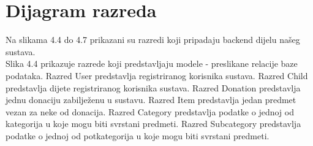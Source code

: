 			
		\section{Dijagram razreda}
			
			
			
			Na slikama 4.4 do 4.7 prikazani su razredi koji pripadaju backend dijelu našeg sustava.\\[5pt]

			Slika 4.4 prikazuje razrede koji predstavljaju modele - preslikane relacije baze podataka. Razred User predstavlja registriranog korisnika sustava. Razred Child predstavlja dijete registriranog korisnika sustava. Razred Donation predstavlja jednu donaciju zabilježenu u sustavu. 
			Razred Item predstavlja jedan predmet vezan za neke od donacija. Razred Category predstavlja podatke o jednoj od kategorija u koje mogu biti svrstani predmeti. Razred Subcategory predstavlja podatke o jednoj od potkategorija u koje mogu biti svrstani predmeti.\\[10pt]

